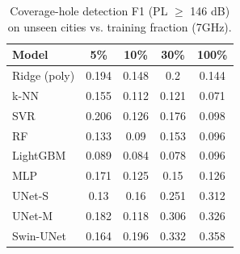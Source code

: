 \begin{table}[t]
\centering
\caption{Coverage-hole detection F1 (PL $\ge$ 146 dB) on unseen cities vs. training fraction (7GHz).}
\begin{tabular}{lcccc}
\hline
Model & 5\% & 10\% & 30\% & 100\% \\
\hline
Ridge (poly) & 0.194 & 0.148 & 0.2 & 0.144 \\
k-NN & 0.155 & 0.112 & 0.121 & 0.071 \\
SVR & 0.206 & 0.126 & 0.176 & 0.098 \\
RF & 0.133 & 0.09 & 0.153 & 0.096 \\
LightGBM & 0.089 & 0.084 & 0.078 & 0.096 \\
MLP & 0.171 & 0.125 & 0.15 & 0.126 \\
UNet-S & 0.13 & 0.16 & 0.251 & 0.312 \\
UNet-M & 0.182 & 0.118 & 0.306 & 0.326 \\
Swin-UNet & 0.164 & 0.196 & 0.332 & 0.358 \\
\hline
\end{tabular}
\end{table}